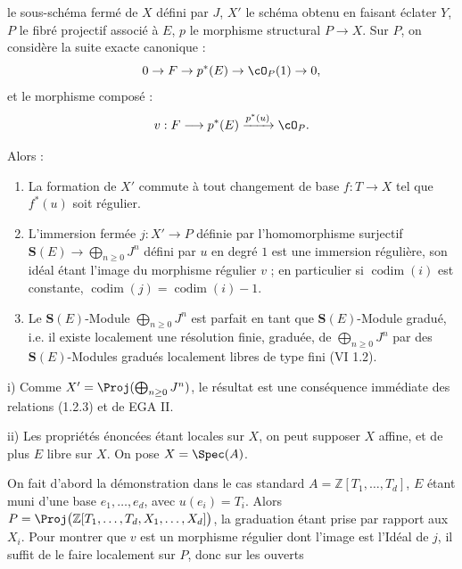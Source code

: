 le sous-schéma fermé de \(X\) défini par \(J\), \(X'\) le schéma obtenu en faisant éclater \(Y\), \(P\) le fibré projectif associé à \(E\), \(p\) le morphisme structural \(P\to X\). Sur \(P\), on considère la suite exacte canonique :
\[
0\to F\to p^*(E)\to\cO_P(1)\to0,
\]
et le morphisme composé :
\[
 v:F\longrightarrow p^*(E)\xrightarrow{p^*(u)}\cO_P .
\]

Alors :
\begin{enumerate}[label=\roman*)]
\item La formation de \(X'\) commute à tout changement de base \(f:T\to X\) tel que \(f^*(u)\) soit régulier.
\item L'immersion fermée \(j:X'\to P\) définie par l'homomorphisme surjectif \(\mathbf{S}(E)\longrightarrow\bigoplus_{n\ge0}J^n\) défini par \(u\) en degré \(1\) est une immersion régulière, son idéal étant l'image du morphisme régulier \(v\) ; en particulier si \(\operatorname{codim}(i)\) est constante, \(\operatorname{codim}(j)=\operatorname{codim}(i)-1\).
\item Le \(\mathbf{S}(E)\)-Module \(\bigoplus_{n\ge0}J^n\) est parfait en tant que \(\mathbf{S}(E)\)-Module gradué, i.e. il existe localement une résolution finie, graduée, de \(\bigoplus_{n\ge0}J^n\) par des \(\mathbf{S}(E)\)-Modules gradués localement libres de type fini (VI 1.2).
\end{enumerate}

i) Comme \(X'=\Proj(\bigoplus_{n\ge0}J^n)\), le résultat est une conséquence immédiate des relations (1.2.3) et de EGA II.

ii) Les propriétés énoncées étant locales sur \(X\), on peut supposer \(X\) affine, et de plus \(E\) libre sur \(X\). On pose \(X=\Spec(A)\).

On fait d'abord la démonstration dans le cas standard \(A=\mathbb Z[T_1,\ldots,T_d]\), \(E\) étant muni d'une base \(e_1,\ldots,e_d\), avec \(u(e_i)=T_i\). Alors \(P=\Proj\bigl(\mathbb Z[T_1,\ldots,T_d,X_1,\ldots,X_d]\bigr)\), la graduation étant prise par rapport aux \(X_i\). Pour montrer que \(v\) est un morphisme régulier dont l'image est l'Idéal de \(j\), il suffit de le faire localement sur \(P\), donc sur les ouverts
